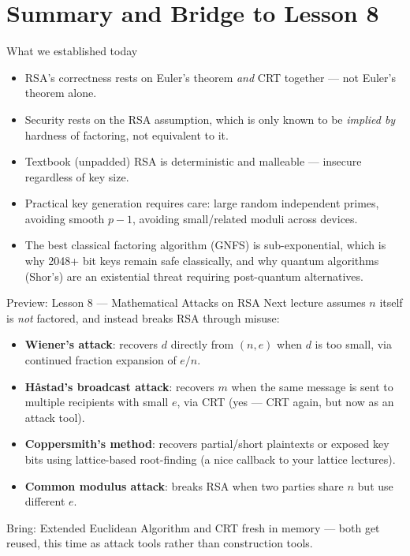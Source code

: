 \newpage
\section{Summary and Bridge to Lesson 8}

\begin{keybox}{What we established today}
\begin{itemize}
\item RSA's correctness rests on Euler's theorem \emph{and} CRT together — not Euler's theorem alone.
\item Security rests on the RSA assumption, which is only known to be \emph{implied by} hardness of factoring, not equivalent to it.
\item Textbook (unpadded) RSA is deterministic and malleable — insecure regardless of key size.
\item Practical key generation requires care: large random independent primes, avoiding smooth $p-1$, avoiding small/related moduli across devices.
\item The best classical factoring algorithm (GNFS) is sub-exponential, which is why 2048+ bit keys remain safe classically, and why quantum algorithms (Shor's) are an existential threat requiring post-quantum alternatives.
\end{itemize}
\end{keybox}

\begin{warnbox}{Preview: Lesson 8 — Mathematical Attacks on RSA}
Next lecture assumes $n$ itself is \emph{not} factored, and instead breaks RSA through misuse:
\begin{itemize}
\item \textbf{Wiener's attack}: recovers $d$ directly from $(n,e)$ when $d$ is too small, via continued fraction expansion of $e/n$.
\item \textbf{Håstad's broadcast attack}: recovers $m$ when the same message is sent to multiple recipients with small $e$, via CRT (yes — CRT again, but now as an attack tool).
\item \textbf{Coppersmith's method}: recovers partial/short plaintexts or exposed key bits using lattice-based root-finding (a nice callback to your lattice lectures).
\item \textbf{Common modulus attack}: breaks RSA when two parties share $n$ but use different $e$.
\end{itemize}
Bring: Extended Euclidean Algorithm and CRT fresh in memory — both get reused, this time as attack tools rather than construction tools.
\end{warnbox}

